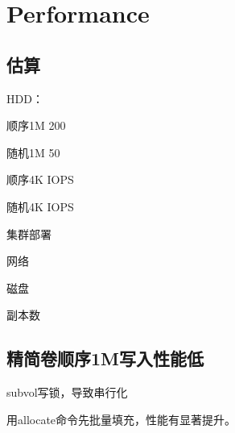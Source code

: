 \section{Performance}

\subsection{估算}

HDD：
\begin{itembox}
\item 顺序1M 200
\item 随机1M 50
\item 顺序4K IOPS
\item 随机4K IOPS
\end{itembox}

集群部署
\begin{enumbox}
\item 网络
\item 磁盘
\item 副本数
\end{enumbox}

\subsection{精简卷顺序1M写入性能低}

subvol写锁，导致串行化

用allocate命令先批量填充，性能有显著提升。
